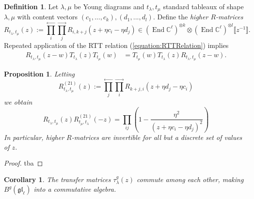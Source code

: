 \documentclass[11pt]{report}
\newtheorem{prop}[theorem]{Proposition}
\newtheorem{corollary}[theorem]{Corollary}
\theoremstyle{definition}
\newtheorem{definition}[theorem]{Definition}
\theoremstyle{remark}
\theoremstyle{remark}
\newcommand{\End}{\operatorname{End}}
\newcommand{\C}{\mathbb{C}}
\begin{document}
\begin{definition}
Let $\lambda,\mu$ be Young diagrams and $t_\lambda,t_\mu$ standard tableaux of shape $\lambda,\mu$ with content vectors $(c_1,...,c_k),(d_1,...,d_l)$. Define the \emph{higher $R$-matrices}
\begin{equation*}
R_{t_\lambda,t_\mu}(z) := \overset{\longleftarrow}{\prod_i} \overset{\longrightarrow}{\prod_j} R_{i,k+j}(z+\eta c_i - \eta d_j) \in (\End \C^\ell)^{\otimes k} \otimes (\End \C^\ell)^{\otimes l}\llbracket z^{-1} \rrbracket.
\end{equation*}
Repeated application of the RTT relation (\ref{equation:RTTRelation}) implies
\begin{align*}
R_{t_\lambda,t_\mu}(z-w) T_{t_\lambda}(z) T_{t_\mu}(w) &= T_{t_\mu}(w) T_{t_\lambda}(z) R_{t_\lambda,t_\mu}(z-w).
\end{align*}
\end{definition}

\begin{prop}
Letting
\begin{equation*}
R_{t_\lambda,t_\mu}^{(21)}(z) := \overset{\longleftarrow}{\prod_j} \overset{\longrightarrow}{\prod_i} R_{k+j,i}(z+\eta d_j - \eta c_i)
\end{equation*}
we obtain
\begin{equation*}
R_{t_\lambda,t_\mu}(z) R_{t_\mu,t_\lambda}^{(21)}(-z) = \prod_{ij} \left( 1 - \frac{\eta^2}{(z+\eta c_i-\eta d_j)^2}\right)
\end{equation*}
In particular, higher $R$-matrices are invertible for all but a discrete set of values of $z$.
\end{prop}

\begin{proof}
tba
\end{proof}

\begin{corollary}
The transfer matrices $\tau_\lambda^g(z)$ commute among each other, making $B^g(\mathfrak{gl}_\ell)$ into a commutative algebra.
\end{corollary}
\end{document}

